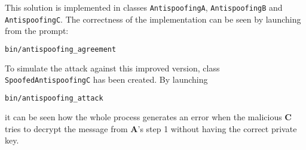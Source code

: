 \documentclass[a4paper,12pt,titlepage]{article}
\begin{document}
This solution is implemented in classes \texttt{AntispoofingA}, \texttt{AntispoofingB} and
\texttt{AntispoofingC}. The correctness of the implementation can be seen by launching
from the prompt:

\begin{lstlisting}[language=bash]
bin/antispoofing_agreement
\end{lstlisting}

To simulate the attack against this improved version, class
\texttt{SpoofedAntispoofingC} has been created. By launching

\begin{lstlisting}[language=bash]
bin/antispoofing_attack
\end{lstlisting}

it can be seen how the whole process generates an error when the malicious
\textbf{C} tries to decrypt the message from \textbf{A}'s step 1 without having the
correct private key.
\end{document}
